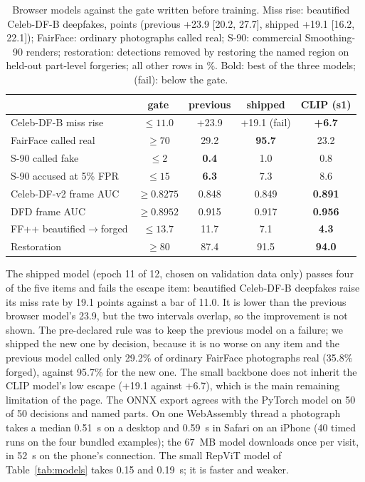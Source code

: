 \documentclass[conference,a4paper]{IEEEtran}
\begin{document}
\begin{table}[!htb]
\centering
\caption{Browser models against the gate written before training. Miss rise: beautified Celeb-DF-B deepfakes, points
(previous +23.9 [20.2, 27.7], shipped +19.1 [16.2, 22.1]); FairFace: ordinary photographs called real; S-90: commercial
Smoothing-90 renders; restoration: detections removed by restoring the named region on held-out part-level forgeries; all
other rows in \%. Bold: best of the three models; (fail): below the gate.}
\label{tab:browser}
\footnotesize
\setlength{\tabcolsep}{3pt}
\begin{tabular}{@{}lcccc@{}}
\toprule
 & gate & previous & shipped & CLIP (s1) \\
\midrule
Celeb-DF-B miss rise & $\le 11.0$ & +23.9 & +19.1 (fail) & \textbf{+6.7} \\
FairFace called real & $\ge 70$ & 29.2 & \textbf{95.7} & 23.2 \\
S-90 called fake & $\le 2$ & \textbf{0.4} & 1.0 & 0.8 \\
S-90 accused at 5\% FPR & $\le 15$ & \textbf{6.3} & 7.3 & 8.6 \\
Celeb-DF-v2 frame AUC & $\ge 0.8275$ & 0.848 & 0.849 & \textbf{0.891} \\
DFD frame AUC & $\ge 0.8952$ & 0.915 & 0.917 & \textbf{0.956} \\
FF++ beautified$\to$forged & $\le 13.7$ & 11.7 & 7.1 & \textbf{4.3} \\
Restoration & $\ge 80$ & 87.4 & 91.5 & \textbf{94.0} \\
\bottomrule
\end{tabular}
\end{table}

The shipped model (epoch 11 of 12, chosen on validation data only) passes four of the five items and fails the escape item:
beautified Celeb-DF-B deepfakes raise its miss rate by 19.1 points against a bar of 11.0. It is lower than the previous
browser model's 23.9, but the two intervals overlap, so the improvement is not shown. The pre-declared rule was to keep the
previous model on a failure; we shipped the new one by decision, because it is no worse on any item and the previous model
called only 29.2\% of ordinary FairFace photographs real (35.8\% forged), against 95.7\% for the new one. The small
backbone does not inherit the CLIP model's low escape (+19.1 against +6.7), which is the main remaining limitation of the
page. The ONNX export agrees with the PyTorch model on 50 of 50 decisions and named parts.
On one WebAssembly thread a photograph takes a median 0.51~s on a desktop and 0.59~s in Safari on an iPhone (40 timed runs
on the four bundled examples); the 67~MB model downloads once per visit, in 52~s on the phone's connection. The small RepViT
model of Table~\ref{tab:models} takes 0.15 and 0.19~s; it is faster and weaker.
\end{document}
